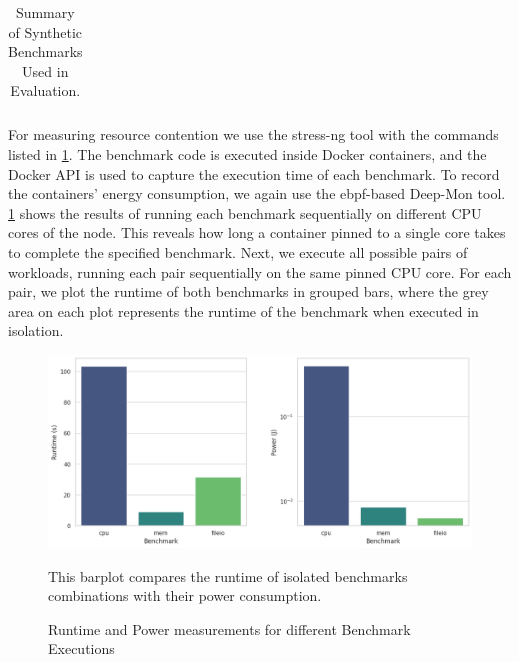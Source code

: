 \begin{table}[H]
{\begin{tabular}{
                p{3cm}   %
                p{6cm}   %
                p{3cm}   %
                p{4cm}   %
            }
            \bottomrule
        \end{tabular}%
    }
    \small
    \caption{Summary of Synthetic Benchmarks Used in Evaluation.}
    \label{tab:synthetic-benchmarks}
\end{table}


For measuring resource contention we use the stress-ng tool with the commands listed in \ref{tab:synthetic-benchmarks}. The benchmark code is executed inside Docker containers, and the Docker API is used to capture the execution time of each benchmark. To record the containers' energy consumption, we again use the ebpf-based Deep-Mon tool.
\ref{fig:bar_plot_iso_bench} shows the results of running each benchmark sequentially on different CPU cores of the node. This reveals how long a container pinned to a single core takes to complete the specified benchmark. Next, we execute all possible pairs of workloads, running each pair sequentially on the same pinned CPU core. For each pair, we plot the runtime of both benchmarks in grouped bars, where the grey area on each plot represents the runtime of the benchmark when executed in isolation.

\begin{figure}[H]
    \centering
    \includegraphics[scale=0.5]{fig/06/06-barplot-iso-bench.png}
    \small
    \caption{Runtime and Power measurements for different Benchmark Executions}
    \label{fig:bar_plot_iso_bench}
    \tiny
    This barplot compares the runtime of isolated benchmarks combinations with their power consumption.
\end{figure}

